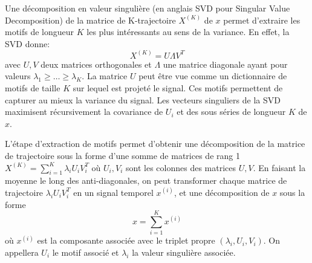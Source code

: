 \documentclass{gretsi}
\def\HH{\mathcal H}
\newcommand{\R}{\mathbb R}
\begin{document}


Une décomposition en valeur singulière (en anglais SVD pour Singular Value Decomposition) de la matrice de K-trajectoire $X^{(K)}$ de $x$ permet d'extraire les motifs de longueur $K$ les plus intéressants au sens de la variance.
En effet, la SVD donne: 
\begin{equation}
    X^{(K)} = U \Lambda V^T
\end{equation}
avec $U, V$ deux matrices orthogonales et $\Lambda$ une matrice diagonale ayant pour valeurs $\lambda_1\ge \dots\ge \lambda_K$.
La matrice $U$ peut être vue comme un dictionnaire de motifs de taille $K$ sur lequel est projeté le signal.
Ces motifs permettent de capturer au mieux la variance du signal.
Les vecteurs singuliers de la SVD maximisent récursivement la covariance de $U_i$ et des sous séries de longueur $K$ de $x$.



L'étape d'extraction de motifs permet d'obtenir une décomposition de la matrice de trajectoire sous la forme d'une somme de matrices de rang 1 $X^{(K)} = \sum_{i=1}^K \lambda_i U_iV_i^T$ où  $U_i, V_i$ sont les colonnes des matrices $U, V$.
En faisant la moyenne le long des anti-diagonales, on peut transformer chaque matrice de trajectoire $\lambda_iU_iV_i^T$  en un signal temporel $x^{(i)}$, et une décomposition de $x$ sous la forme 
\begin{equation}
    x = \sum_{i=1}^K x^{(i)}
\end{equation}
où $x^{(i)} $ est la composante associée avec le triplet propre $(\lambda_i, U_i, V_i)$.
On appellera $U_i$ le motif associé et $\lambda_i$ la valeur singulière associée.


\end{document}
